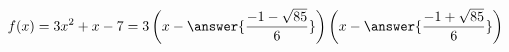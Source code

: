 \documentclass{ximera}
\author{Lee Wayand}
\begin{document}
\begin{example}








\begin{question}


\[
f(x) = 3x^2 + x - 7 = 3 \left( x - \answer{\frac{-1 - \sqrt{85}}{6}} \right) \left( x - \answer{\frac{-1 + \sqrt{85}}{6}} \right)
\]

\end{question}















\end{example}
\end{document}
